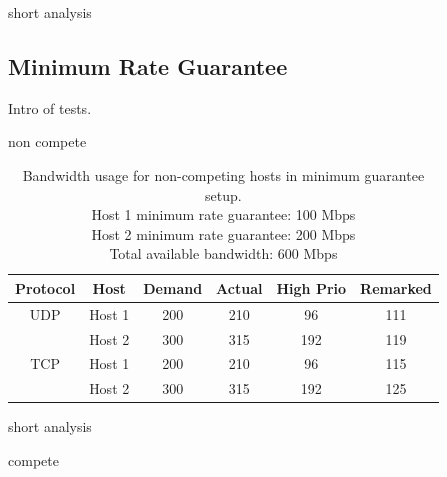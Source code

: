 \documentclass[accepted,single]{gipaper}
\begin{document}
short analysis

\subsection{Minimum Rate Guarantee}
\label{min_guar}

Intro of tests.

non compete

\begin{table}[h]
	\label{mg_nc}
	\vspace{-3mm}
	\begin{center}
		\begin{small}
		\setlength\tabcolsep{1.5pt}
			\begin{tabular}{cccccc}
				Protocol & Host & Demand & Actual & High Prio & Remarked \\
				\hline
				UDP & Host 1 & 200 & 210 & 96 & 111\\
				    & Host 2 & 300 & 315 & 192 & 119\\
				\hline
				TCP & Host 1 & 200 & 210 & 96 & 115\\
				    & Host 2 & 300 & 315 & 192 & 125\\
			\end{tabular}
		\end{small}
	\end{center}
	\caption{Bandwidth usage for non-competing hosts in minimum guarantee setup.\\
	Host 1 minimum rate guarantee: 100 Mbps\\
	Host 2 minimum rate guarantee: 200 Mbps\\	
	Total available bandwidth: 600 Mbps}
	\vspace{-3mm}
\end{table}

short analysis

compete
\end{document}
